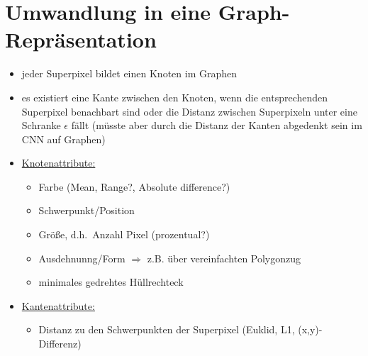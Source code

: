 \section{Umwandlung in eine Graph-Repräsentation}

\begin{itemize}
  \item jeder Superpixel bildet einen Knoten im Graphen
  \item es existiert eine Kante zwischen den Knoten, wenn die entsprechenden Superpixel benachbart sind oder die Distanz zwischen Superpixeln unter eine Schranke $\epsilon$ fällt (müsste aber durch die Distanz der Kanten abgedenkt sein im CNN auf Graphen)
  \item \underline{Knotenattribute:}
  \begin{itemize}
    \item Farbe (Mean, Range?, Absolute difference?)
    \item Schwerpunkt/Position
    \item Größe, d.h.\ Anzahl Pixel (prozentual?)
    \item Ausdehnunng/Form $\Rightarrow$ z.B. über vereinfachten Polygonzug
    \item minimales gedrehtes Hüllrechteck
  \end{itemize}
  \item \underline{Kantenattribute:}
  \begin{itemize}
    \item Distanz zu den Schwerpunkten der Superpixel (Euklid, L1, (x,y)-Differenz)
  \end{itemize}
\end{itemize}
